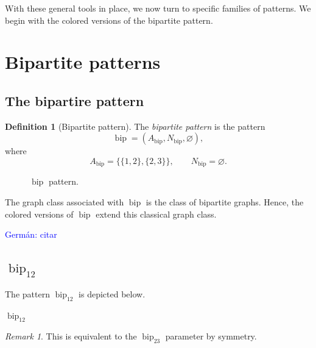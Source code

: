 \documentclass[12pt]{article}
\theoremstyle{plain}
\theoremstyle{definition}
\newtheorem{definition}[theorem]{Definition}
\theoremstyle{remark}
\newtheorem{remark}[theorem]{Remark}
\theoremstyle{definition}
\newcommand{\biplabel}{\mathrm{bip}}
\DeclareRobustCommand{\bipname}{%
  \ensuremath{\mathop{\biplabel}\nolimits}%
}
\DeclareRobustCommand{\bipparam}[1]{%
  \ensuremath{\mathop{\biplabel}\nolimits_{#1}}%
}
\newcommand{\german}[1]{%
  \textcolor{blue}{Germán: #1}%
}
\begin{document}
With these general tools in place, we now turn to specific families of
patterns. We begin with the colored versions of the bipartite pattern.




\section{Bipartite patterns}\label{sec:bipartite-patterns}

\subsection{The bipartire pattern}
\label{subsec:bip-definitions}

\begin{definition}[Bipartite pattern]
The \emph{bipartite pattern} is the pattern
\[
\bipname=(A_{\biplabel},N_{\biplabel},\varnothing),
\]
where
\[
A_{\biplabel}=\bigl\{\{1,2\},\{2,3\}\bigr\},
\qquad
N_{\biplabel}=\varnothing.
\]
\end{definition}

\begin{figure}[h]
\centering
{}
\caption{\(\bipname\) pattern.}
\label{fig:bip-uncolored}
\end{figure}


The graph class associated with \(\bipname\) is the class of bipartite
graphs. Hence, the colored versions of \(\bipname\) extend this classical
graph class.

\german{citar}

\subsection{\texorpdfstring{\(\bipparam{12}\)}{bip12}}
\label{subsec:bip12}

The pattern \(\bipparam{12}\) is depicted below.

\begin{center}

\smallskip
\(\bipparam{12}\)
\end{center}
\begin{remark}
  This is equivalent to the \(\bipparam{23}\) parameter by symmetry.
\end{remark}
\end{document}
